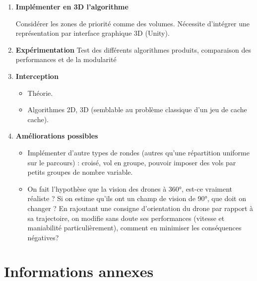 \documentclass[12pt, openany]{article}
\begin{document}
\begin{enumerate}
\item
\textbf{Implémenter en 3D l'algorithme}

Considérer les zones de priorité comme des volumes. Nécessite d'intégrer une représentation par interface graphique 3D (Unity). 

\item
\textbf{Expérimentation}
Test des différents algorithmes produits, comparaison des performances et de la modularité

\item
\textbf{Interception}
\begin{itemize}
    \setlength\itemsep{0.1cm}
    \item Théorie.
    \item Algorithmes 2D, 3D (semblable au problème classique d'un jeu de cache cache).
\end{itemize}

\item
\textbf{Améliorations possibles}
\begin{itemize}
    \setlength\itemsep{0.1cm}
    
    \item Implémenter d’autre types de rondes (autres qu'une répartition uniforme sur le parcours) : croisé, vol en groupe, pouvoir imposer des vols par petits groupes de nombre variable.
    
    \item On fait l'hypothèse que la vision des drones à 360°, est-ce vraiment réaliste ? Si on estime qu’ils ont un champ de vision de 90°, que doit on changer ? En rajoutant une consigne d'orientation du drone par rapport à sa trajectoire, on modifie sans doute ses performances (vitesse et maniabilité particulièrement), comment en minimiser les conséquences négatives?
\end{itemize} 


\end{enumerate}

\newpage
\section{Informations annexes}
\vspace{1cm}
\end{document}
